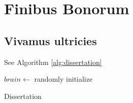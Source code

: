 \chapter{Finibus Bonorum}

\lipsum[11]

\section{Vivamus ultricies}

\lipsum[9-10] See Algorithm \ref{alg:dissertation}

\begin{algorithm}[H]
    \SetAlgoLined
    $brain \gets$ randomly initialize\;
    \caption{Dissertation}
    \label{alg:dissertation}
\end{algorithm}